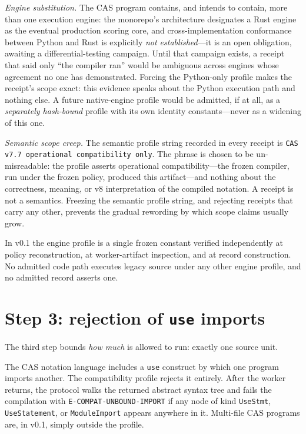 \emph{Engine substitution.} The CAS program contains, and intends to contain, more than one execution engine: the monorepo's architecture designates a Rust engine as the eventual production scoring core, and cross-implementation conformance between Python and Rust is explicitly \emph{not established}---it is an open obligation, awaiting a differential-testing campaign. Until that campaign exists, a receipt that said only ``the compiler ran'' would be ambiguous across engines whose agreement no one has demonstrated. Forcing the Python-only profile makes the receipt's scope exact: this evidence speaks about the Python execution path and nothing else. A future native-engine profile would be admitted, if at all, as a \emph{separately hash-bound} profile with its own identity constants---never as a widening of this one.

\emph{Semantic scope creep.} The semantic profile string recorded in every receipt is \texttt{CAS v7.7 operational compatibility only}. The phrase is chosen to be un-misreadable: the profile asserts operational compatibility---the frozen compiler, run under the frozen policy, produced this artifact---and nothing about the correctness, meaning, or v8 interpretation of the compiled notation. A receipt is not a semantics. Freezing the semantic profile string, and rejecting receipts that carry any other, prevents the gradual rewording by which scope claims usually grow.

\begin{invariant}\label{ch07:inv:one-profile}
In v0.1 the engine profile is a single frozen constant verified independently at policy reconstruction, at worker-artifact inspection, and at record construction. No admitted code path executes legacy source under any other engine profile, and no admitted record asserts one.
\end{invariant}

\section{Step 3: rejection of \texttt{use} imports}\label{ch07:step3}

The third step bounds \emph{how much} is allowed to run: exactly one source unit.

The CAS notation language includes a \texttt{use} construct by which one program imports another. The compatibility profile rejects it entirely. After the worker returns, the protocol walks the returned abstract syntax tree and fails the compilation with \texttt{E-COMPAT-UNBOUND-IMPORT} if any node of kind \texttt{UseStmt}, \texttt{UseStatement}, or \texttt{ModuleImport} appears anywhere in it. Multi-file CAS programs are, in v0.1, simply outside the profile.


